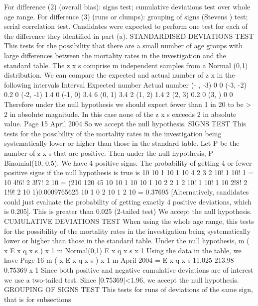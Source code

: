 \documentclass[a4paper,12pt]{article}
\begin{document}
For difference (2) (overall bias): signs test; cumulative deviations test
over whole age range.
For difference (3) (runs or clumps): grouping of signs (Stevens ) test;
serial correlation test.
Candidates were expected to perform one test for each of the
difference they identified in part (a).
\newpage
STANDARDISED DEVIATIONS TEST
This tests for the possibility that there are a small number of age
groups with large differences between the mortality rates in the
investigation and the standard table.
The z x s comprise m independent samples from a Normal (0,1)
distribution. We can compare the expected and actual number of z x in
the following intervals
Interval
Expected number
Actual number
(- , -3)
0
0
(-3, -2)
0.2
0
(-2, -1)
1.4
0
(-1, 0)
3.4
6
(0, 1)
3.4
2
(1, 2)
1.4
2
(2, 3)
0.2
0
(3, )
0
0
Therefore under the null hypothesis we should expect fewer than 1 in
20 to be > 2 in absolute magnitude.
In this case none of the z x s exceeds 2 in absolute value.
Page 15 %
April 2004
So we accept the null hypothesis.
SIGNS TEST
This tests for the possibility of the mortality rates in the investigation
being systematically lower or higher than those in the standard table.
Let P be the number of z x s that are positive.
Then under the null hypothesis, P ~ Binomial(10, 0.5).
We have 4 positive signs. The probability of getting 4 or fewer
positive signs if the null hypothesis is true is
10
10
1
10
1
10
4 2
3 2
10! 1
10! 1
=
10
4!6! 2
3!7! 2 10
= (210 120 45 10
10
1
10
10
1
10
2 2
1 2
10! 1
10! 1
10
2!8! 2
1!9! 2 10
1)0.0009765625
10
1
0 2 10
1
2 10
= 0.37695
[Alternatively, candidates could just evaluate the probability of getting
exactly 4 positive deviations, which is 0.205].
This is greater than 0.025 (2-tailed test)
We accept the null hypothesis.
CUMULATIVE DEVIATIONS TEST
When using the whole age range, this tests for the possibility of the
mortality rates in the investigation being systematically lower or higher
than those in the standard table.
Under the null hypothesis,
m
(
x
E x q x s )
x 1
m
Normal(0,1)
E x q x s
x 1
Using the data in the table, we have
Page 16 %
m
(
x
E x q x s )
x 1
m
April 2004
=
E x q x s
11.025
213.98
0.75369
x 1
Since both positive and negative cumulative deviations are of interest
we use a two-tailed test.
Since |0.75369|<1.96,
we accept the null hypothesis.
GROUPING OF SIGNS TEST
This tests for runs of deviations of the same sign, that is for subsections
\end{document}
